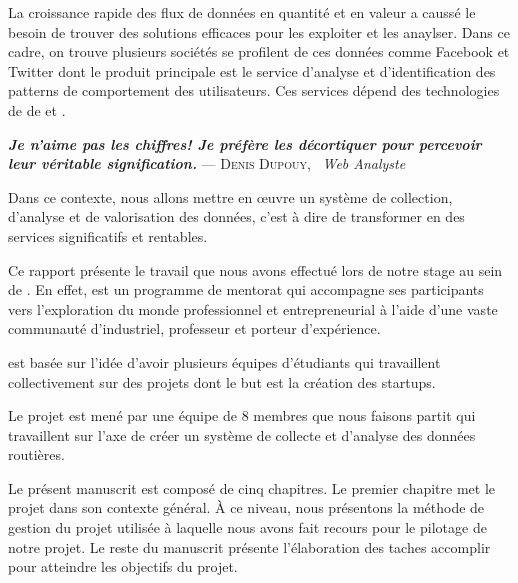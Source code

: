 La croissance rapide des flux de données en quantité et en valeur a caussé le
besoin de trouver des solutions efficaces pour les exploiter et les anaylser.
Dans ce cadre, on trouve plusieurs sociétés se profilent de ces données comme
Facebook et Twitter dont le produit principale est le service d'analyse et
d'identification des patterns de comportement des utilisateurs. Ces services
dépend des technologies de de  et .


\begin{center}
\textbf{\textit{Je n’aime pas les chiffres! Je préfère les décortiquer pour
percevoir leur véritable signification.}} \linebreak
\hfill --- \textsc{Denis Dupouy}, \ \textit{Web Analyste}
\end{center}

Dans ce contexte, nous allons mettre en \oe{}uvre un système de
collection, d'analyse et de valorisation des données, c'est à dire de transformer
en des services significatifs et rentables.

Ce rapport présente le travail que nous avons effectué lors de notre stage au
sein de . En effet,  est
un programme de mentorat qui accompagne ses participants vers l'exploration du monde
professionnel et entrepreneurial à l'aide d'une vaste communauté d'industriel,
professeur et porteur d'expérience.

 est basée sur l'idée d'avoir plusieurs équipes d'étudiants
qui travaillent collectivement sur des projets dont le but est la création des
startups.

Le projet  est mené par une équipe de 8 membres que nous faisons partit
qui travaillent sur l'axe de créer un système de collecte et d'analyse
des données routières.

Le présent manuscrit est composé de cinq chapitres. Le premier chapitre met le
projet dans son contexte général. À ce niveau, nous présentons la méthode de
gestion du projet utilisée à laquelle nous avons fait recours pour le pilotage
de notre projet. Le reste du manuscrit présente l'élaboration des taches
accomplir pour atteindre les objectifs du projet.
